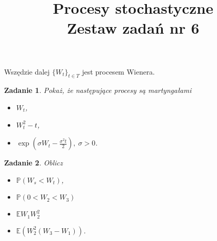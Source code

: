 \documentclass[12pt]{article}
\title{Procesy stochastyczne\\ Zestaw zadań nr 6}
\newtheorem{zd}{Zadanie}
\begin{document}
\maketitle
Wszędzie dalej $\{W_t\}_{t\in T}$ jest procesem Wienera.
\begin{zd}
	Pokaż, że następujące procesy są martyngałami
	\begin{itemize}
		\item $W_t$, 
		\item $W_t^2 - t$,
		\item $\exp\left(\sigma W_t - \frac{\sigma^2t}{2}\right),\ \sigma > 0$.
	\end{itemize}
\end{zd}
\begin{zd}
	Oblicz
	\begin{itemize}
		\item $\mathbb{P}(W_s < W_t)$,
		\item $\mathbb{P}(0 < W_2 < W_3)$
		\item $\mathbb{E}W_1W_2^2$
		\item $\mathbb{E}\left(W_2^2(W_3 - W_1)\right)$.
	\end{itemize}
\end{zd}
\end{document}
